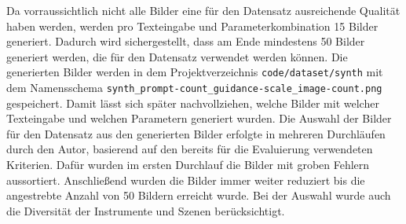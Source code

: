 Da vorraussichtlich nicht alle Bilder eine für den Datensatz ausreichende Qualität haben werden, werden pro Texteingabe und Parameterkombination 15 Bilder generiert.
Dadurch wird sichergestellt, dass am Ende mindestens 50 Bilder generiert werden, die für den Datensatz verwendet werden können. Die generierten Bilder werden in dem Projektverzeichnis \texttt{code/dataset/synth} mit dem Namensschema \texttt{synth\_prompt-count\_guidance-scale\_image-count.png} gespeichert.
Damit lässt sich später nachvollziehen, welche Bilder mit welcher Texteingabe und welchen Parametern generiert wurden. 
Die Auswahl der Bilder für den Datensatz aus den generierten Bilder erfolgte in mehreren Durchläufen durch den Autor, basierend auf den bereits für die Evaluierung verwendeten Kriterien. Dafür wurden im ersten Durchlauf die Bilder mit groben Fehlern aussortiert. Anschließend wurden die Bilder immer weiter reduziert bis die angestrebte Anzahl von 50 Bildern erreicht wurde. Bei der Auswahl wurde auch die Diversität der Instrumente und Szenen berücksichtigt.
